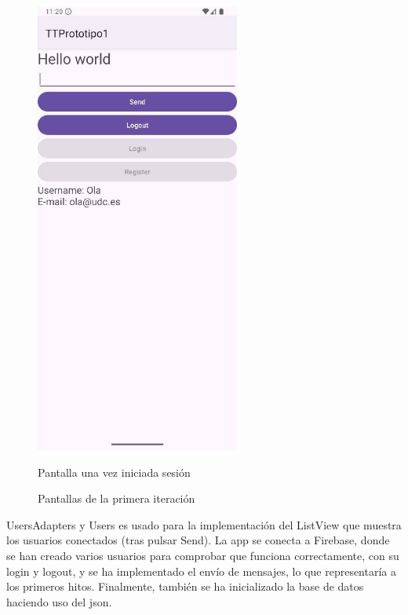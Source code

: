 \documentclass[a4paper,openright,12pt]{article}
\begin{document}
\begin{figure}[htp]
\begin{minipage}{0.4\textwidth}
        \includegraphics[width=0.6\textwidth]{Images/Vista_It1_2.jpg} 
        \caption{Pantalla una vez iniciada sesión}
        \label{fig:figura2}
    \end{minipage}
    \caption{Pantallas de la primera iteración}
    \label{fig:side_by_side}
\end{figure}

UsersAdapters y Users es usado para la implementación del ListView que muestra los usuarios conectados (tras pulsar Send). La app se conecta a Firebase, donde se han creado varios usuarios para comprobar que funciona correctamente, con su login y logout, y se ha implementado el envío de mensajes, lo que representaría a los primeros hitos.
Finalmente, también se ha inicializado la base de datos haciendo uso del json.
\end{document}

